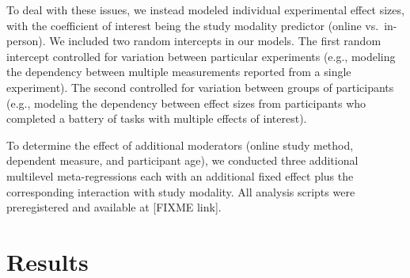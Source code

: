 \documentclass[
  man,floatsintext]{apa6}
\begin{document}
To deal with these issues, we instead modeled individual experimental effect sizes, with the coefficient of interest being the study modality predictor (online vs.~in-person). We included two random intercepts in our models. The first random intercept controlled for variation between particular experiments (e.g., modeling the dependency between multiple measurements reported from a single experiment). The second controlled for variation between groups of participants (e.g., modeling the dependency between effect sizes from participants who completed a battery of tasks with multiple effects of interest).

To determine the effect of additional moderators (online study method, dependent measure, and participant age), we conducted three additional multilevel meta-regressions each with an additional fixed effect plus the corresponding interaction with study modality. All analysis scripts were preregistered and available at {[}FIXME link{]}.

\hypertarget{results}{%
\section{Results}\label{results}}
\end{document}

